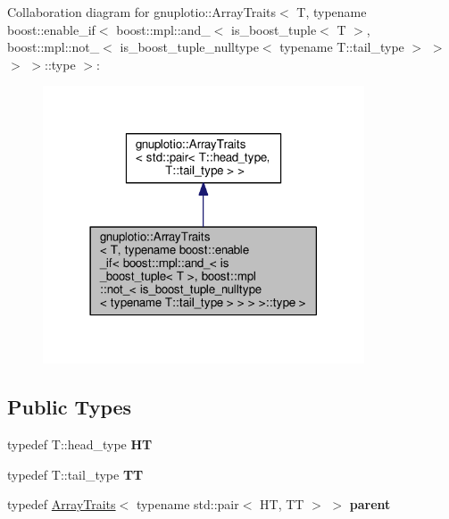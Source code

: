 Collaboration diagram for gnuplotio\+:\+:Array\+Traits$<$ T, typename boost\+:\+:enable\+\_\+if$<$ boost\+:\+:mpl\+:\+:and\+\_\+$<$ is\+\_\+boost\+\_\+tuple$<$ T $>$, boost\+:\+:mpl\+:\+:not\+\_\+$<$ is\+\_\+boost\+\_\+tuple\+\_\+nulltype$<$ typename T\+:\+:tail\+\_\+type $>$ $>$ $>$ $>$\+:\+:type $>$\+:
\nopagebreak
\begin{figure}[H]
\begin{center}
\leavevmode
\includegraphics[width=270pt]{classgnuplotio_1_1_array_traits_3_01_t_00_01typename_01boost_1_1enable__if_3_01boost_1_1mpl_1_1aba4443da019311cdd4c31f059136bc6c}
\end{center}
\end{figure}
\subsection*{Public Types}
\begin{DoxyCompactItemize}
\item 
typedef T\+::head\+\_\+type {\bfseries HT}\hypertarget{classgnuplotio_1_1_array_traits_3_01_t_00_01typename_01boost_1_1enable__if_3_01boost_1_1mpl_1_1a8de3a8fe198d85f7f5d28b9a2f5bf229_ab56761f05b74be318cc7becbc59348df}{}\label{classgnuplotio_1_1_array_traits_3_01_t_00_01typename_01boost_1_1enable__if_3_01boost_1_1mpl_1_1a8de3a8fe198d85f7f5d28b9a2f5bf229_ab56761f05b74be318cc7becbc59348df}

\item 
typedef T\+::tail\+\_\+type {\bfseries TT}\hypertarget{classgnuplotio_1_1_array_traits_3_01_t_00_01typename_01boost_1_1enable__if_3_01boost_1_1mpl_1_1a8de3a8fe198d85f7f5d28b9a2f5bf229_a16316f598ab57b0b7ceea99dcd34632e}{}\label{classgnuplotio_1_1_array_traits_3_01_t_00_01typename_01boost_1_1enable__if_3_01boost_1_1mpl_1_1a8de3a8fe198d85f7f5d28b9a2f5bf229_a16316f598ab57b0b7ceea99dcd34632e}

\item 
typedef \hyperlink{classgnuplotio_1_1_array_traits}{Array\+Traits}$<$ typename std\+::pair$<$ HT, TT $>$ $>$ {\bfseries parent}\hypertarget{classgnuplotio_1_1_array_traits_3_01_t_00_01typename_01boost_1_1enable__if_3_01boost_1_1mpl_1_1a8de3a8fe198d85f7f5d28b9a2f5bf229_aad44f59a1d618b863442a9fdaa83d142}{}\label{classgnuplotio_1_1_array_traits_3_01_t_00_01typename_01boost_1_1enable__if_3_01boost_1_1mpl_1_1a8de3a8fe198d85f7f5d28b9a2f5bf229_aad44f59a1d618b863442a9fdaa83d142}

\end{DoxyCompactItemize}
